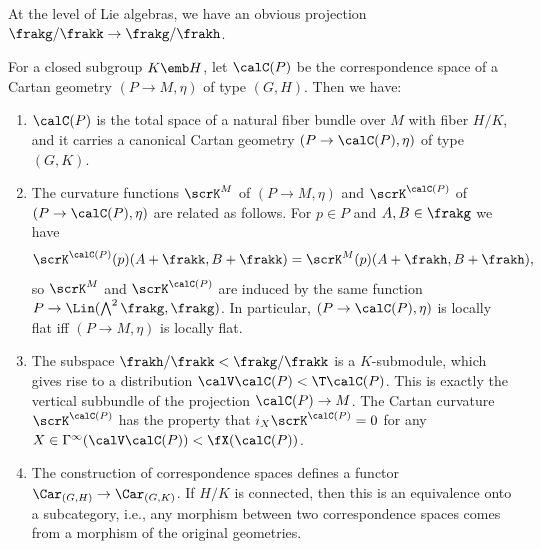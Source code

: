 At the level of Lie algebras, we have an obvious projection $\frakg\slash\frakk\to \frakg\slash\frakh$.

\begin{prop}
    For a closed subgroup $K\emb H$, let $\calC(P)$ be the correspondence space of a Cartan geometry $(P\to M,\eta)$ of type $(G,H)$. Then we have:
    \begin{enumerate}[label=(\arabic*)]
        \item $\calC(P)$ is the total space of a natural fiber bundle over $M$ with fiber $H\slash K$, and it carries a canonical Cartan geometry $(P\to \calC(P),\eta)$ of type $(G,K)$.
        \item The curvature functions $\scrK^M$ of $(P\to M,\eta)$ and $\scrK^{\calC(P)}$ of $(P\to \calC(P),\eta)$ are related as follows. For $p\in P$ and $A,B\in\frakg$ we have 
        \[\scrK^{\calC(P)}(p)(A+\frakk,B+\frakk)=\scrK^M(p)(A+\frakh,B+\frakh),\]
        so $\scrK^M$ and $\scrK^{\calC(P)}$ are induced by the same function $P\to \Lin(\bigwedge\nolimits^2\frakg,\frakg)$. In particular, $(P\to \calC(P),\eta)$ is locally flat iff $(P\to M,\eta)$ is locally flat.
        \item The subspace $\frakh\slash\frakk< \frakg\slash \frakk$ is a $K$-submodule, which gives rise to a distribution $\calV\calC(P)<\T \calC(P)$. This is exactly the vertical subbundle of the projection $\calC(P)\to M$. The Cartan curvature $\scrK^{\calC(P)}$ has the property that $i_X \scrK^{\calC(P)}=0$ for any $X\in\Gamma^\infty(\calV\calC(P))<\fX(\calC(P))$.
        \item The construction of correspondence spaces defines a functor $\Car_{(G,H)}\to \Car_{(G,K)}$. If $H\slash K$ is connected, then this is an equivalence onto a subcategory, i.e., any morphism between two correspondence spaces comes from a morphism of the original geometries.
    \end{enumerate}
\end{prop}

